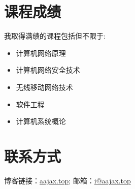 \documentclass[a4paper, 10pt]{article}
\begin{document}
\section*{课程成绩}
\noindent 我取得满绩的课程包括但不限于:
\begin{itemize}[left=20pt]
    \setlength{\itemsep}{0pt}
    \item 计算机网络原理
    \item 计算机网络安全技术
    \item 无线移动网络技术
    \item 软件工程
    \item 计算机系统概论
\end{itemize}

\section*{联系方式}
\noindent 博客链接：\href{https://aajax.top}{aajax.top}; 邮箱：\href{mailto:i@aajax.top}{i@aajax.top}
\end{document}
